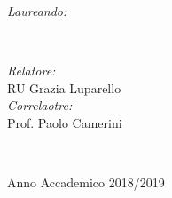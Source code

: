\begin{titlepage}
\makeatletter
\HRule \\[0.4cm]
{ \huge \bfseries \@title}\\[0.4cm] %
\HRule \\[2.5cm]
 

\begin{minipage}{0.4\textwidth}
\begin{flushleft} \large
\emph{Laureando:}\\
\@author %
\end{flushleft}
\end{minipage}
~
\begin{minipage}{0.4\textwidth}
\begin{flushright} \large
\emph{Relatore:} \\
RU Grazia Luparello
\\[1.2em] %
\emph{Correlaotre:} \\
Prof. Paolo Camerini %
\end{flushright}
\end{minipage}\\[5cm]
\makeatother



{\large Anno Accademico 2018/2019 }\\[0.5cm]

\vfill %

\end{titlepage}